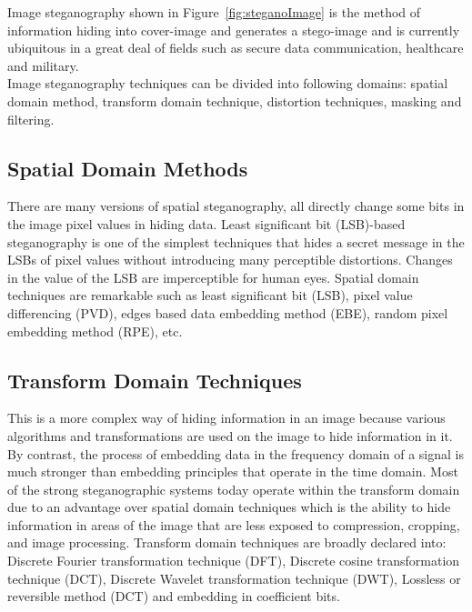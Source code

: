 \documentclass[conference]{IEEEtran}
\begin{document}
\indent Image steganography shown in Figure~\ref{fig:steganoImage} is the method of information hiding into cover-image and  generates a stego-image and is currently ubiquitous in a great deal of fields such as secure data communication, healthcare and military. \\[0.2cm]
\indent Image steganography techniques can be divided into following domains: spatial domain method, transform domain technique, distortion techniques, masking and filtering. 

\subsection{Spatial Domain Methods}
There are many versions of spatial steganography, all directly change some bits in the image pixel values in hiding data. Least significant bit (LSB)-based steganography is one of the simplest techniques that hides a secret message in the LSBs of pixel values without introducing many perceptible distortions. Changes in the value of the LSB are imperceptible for human eyes. Spatial domain techniques are remarkable such as least significant bit (LSB), pixel value differencing (PVD), edges based data embedding method (EBE), random pixel embedding method (RPE), etc. 

\subsection{Transform Domain Techniques}
This is a more complex way of hiding information in an image because various algorithms and transformations are used on the image to hide information in it. By contrast, the process of embedding data in the frequency domain of a signal is much stronger than embedding principles that operate in the time domain. Most of the strong steganographic systems today operate within the transform domain due to an advantage over spatial domain techniques which is the ability to hide information in areas of the image that are less exposed to compression, cropping, and image processing. Transform domain techniques are broadly declared into: Discrete Fourier transformation technique (DFT), Discrete cosine transformation technique (DCT), Discrete Wavelet transformation technique (DWT), Lossless or reversible method (DCT) and embedding in coefficient bits. 
\end{document}
